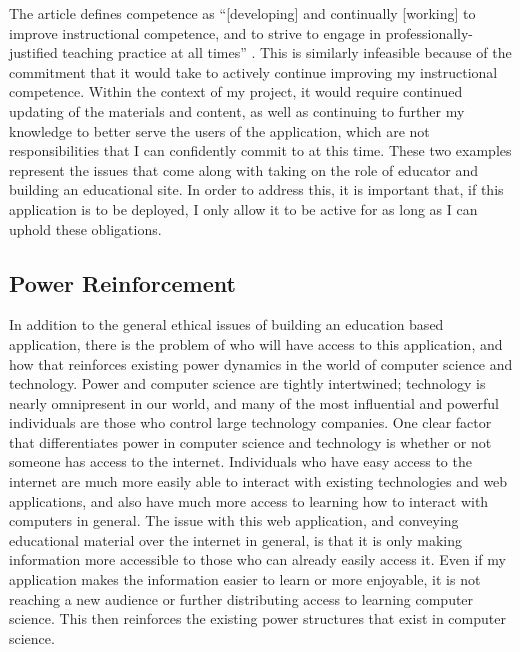 \documentclass[10pt,twocolumn]{article}
\begin{document}
The article defines competence as “[developing] and continually [working] to improve instructional competence, and to 
strive to engage in professionally-justified teaching practice at all times” \cite{MichiganEducation}. This is 
similarly infeasible because of the commitment that it would take to actively continue improving my instructional 
competence. Within the context of my project, it would require continued updating of the materials and content, as well 
as continuing to further my knowledge to better serve the users of the application, which are not responsibilities that 
I can confidently commit to at this time. These two examples represent the issues that come along with taking on the 
role of educator and building an educational site. In order to address this, it is important that, if this application 
is to be deployed, I only allow it to be active for as long as I can uphold these obligations. 

\subsection{Power Reinforcement}

In addition to the general ethical issues of building an education based application, there is the problem of who will 
have access to this application, and how that reinforces existing power dynamics in the world of computer science and 
technology. Power and computer science are tightly intertwined; technology is nearly omnipresent in our world, and many 
of the most influential and powerful individuals are those who control large technology companies. One clear factor that 
differentiates power in computer science and technology is whether or not someone has 
access to the internet. Individuals who have easy access to the internet are much more easily able to interact with 
existing technologies and web applications, and also have much more access to learning how to interact with computers in 
general. The issue with this web application, and conveying educational material over the internet in general, is that 
it is only making information more accessible to those who can already easily access it. Even if my application makes 
the information easier to learn 
or more enjoyable, it is not reaching a new audience or further distributing access to learning computer science. This 
then reinforces the existing power structures that exist in computer science. 
\end{document}
